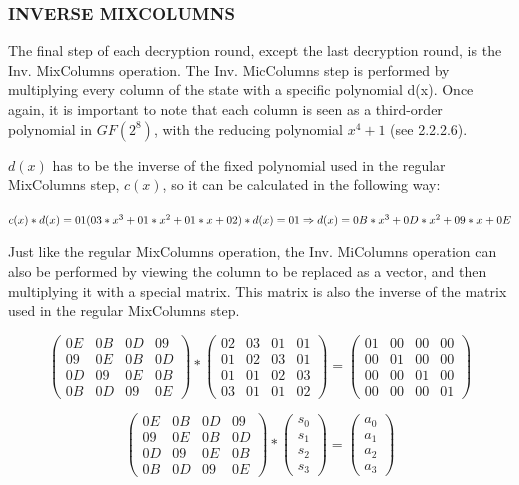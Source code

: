 \documentclass[12pt]{report}
\theoremstyle{definition}
\theoremstyle{remark}
\begin{document}
\subsubsection{INVERSE MIXCOLUMNS}
The final step of each decryption round, except the last decryption round, is the Inv. MixColumns operation. The Inv. MicColumns step is performed by multiplying every column of the state with a specific polynomial d(x)\cite{Rijndael}. Once again, it is important to note that each column is seen as a third-order polynomial in $GF(2^8)$, with the reducing polynomial $x^4+1$ (see 2.2.2.6).

$d(x)$ has to be the inverse of the fixed polynomial used in the regular MixColumns step, $c(x)$, so it can be calculated in the following way:

\noindent
$c(x)*d(x)=01 \\
(03*x^3+01*x^2+01*x+02)*d(x)=01 \\
\Rightarrow d(x)=0B*x^3+0D*x^2+09*x+0E$

Just like the regular MixColumns operation, the Inv. MiColumns operation can also be performed by viewing the column to be replaced as a vector, and then multiplying it with a special matrix. This matrix is also the inverse of the matrix used in the regular MixColumns step.

\[ \left( \begin{array}{cccc}
0E & 0B & 0D & 09 \\
09 & 0E & 0B & 0D \\
0D & 09 & 0E & 0B \\
0B & 0D & 09 & 0E\end{array} \right)
*
\left( \begin{array}{cccc}
02 & 03 & 01 & 01 \\
01 & 02 & 03 & 01 \\
01 & 01 & 02 & 03 \\
03 & 01 & 01 & 02\end{array} \right)
=
\left( \begin{array}{cccc}
01 & 00 & 00 & 00 \\
00 & 01 & 00 & 00 \\
00 & 00 & 01 & 00 \\
00 & 00 & 00 & 01\end{array} \right)
\]

\[ \left( \begin{array}{cccc}
0E & 0B & 0D & 09 \\
09 & 0E & 0B & 0D \\
0D & 09 & 0E & 0B \\
0B & 0D & 09 & 0E\end{array} \right)
*
\left( \begin{array}{c}
s_0 \\
s_1 \\
s_2 \\
s_3\end{array} \right)
=
\left( \begin{array}{c}
a_0 \\
a_1 \\
a_2 \\
a_3\end{array} \right)
\]
\end{document}
